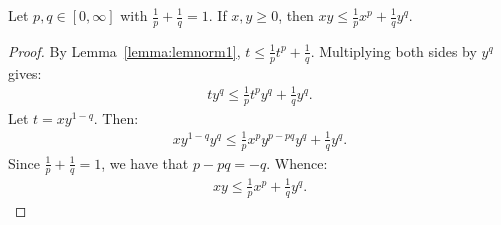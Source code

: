     \begin{lemma}
        Let $p,q \in [0,\infty]$ with $\frac{1}{p} + \frac{1}{q} = 1$. If $x,y \geq 0$, then $xy \leq \frac{1}{p}x^p + \frac{1}{q}y^q$. 
    \end{lemma}
        \begin{proof}
            By Lemma~\ref{lemma:lemnorm1}, $t \leq \frac{1}{p}t^p + \frac{1}{q}$. Multiplying both sides by $y^q$ gives:
                \begin{equation*}
                \begin{split}
                    ty^q \leq \frac{1}{p}t^p y^q + \frac{1}{q}y^q.
                \end{split}
                \end{equation*}
            Let $t = xy^{1-q}$. Then:
                \begin{equation*}
                \begin{split}
                    xy^{1-q}y^q \leq \frac{1}{p}x^p y^{p-pq}y^q + \frac{1}{q}y^q.
                \end{split}
                \end{equation*}
            Since $\frac{1}{p} + \frac{1}{q} = 1$, we have that $p-pq = -q$. Whence:
                \begin{equation*}
                \begin{split}
                    xy \leq \frac{1}{p}x^p + \frac{1}{q}y^q.
                \end{split}
                \end{equation*}
        \end{proof}

